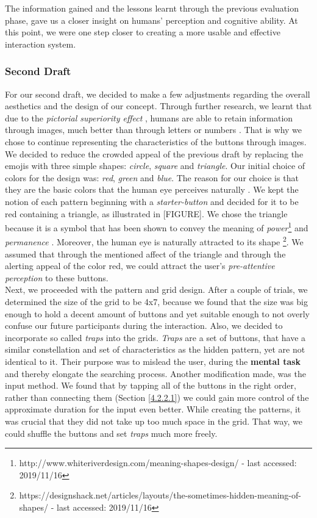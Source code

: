 The information gained and the lessons learnt through the previous evaluation phase, gave us a closer insight on humans' perception and cognitive ability. At this point, we were one step closer to creating a more usable and effective interaction system.

\subsubsection{Second Draft} \label{4.2.2.3}

For our second draft, we decided to make a few adjustments regarding the overall aesthetics and the design of our concept. Through further research, we learnt that due to the \textit{pictorial superiority effect} \cite{pictorial}, humans are able to retain information through images, much better than through letters or numbers \cite{pictorial, 2014}. That is why we chose to continue representing the characteristics of the buttons through images. We decided to reduce the crowded appeal of the previous draft by replacing the emojis with three simple shapes: \textit{circle}, \textit{square} and \textit{triangle}. Our initial choice of colors for the design was: \textit{red}, \textit{green} and \textit{blue}. The reason for our choice is that they are the basic colors that the human eye perceives naturally \cite{Butz2014}. We kept the notion of each pattern beginning with a \textit{starter-button} and decided for it to be red containing a triangle, as illustrated in [FIGURE]. We chose the triangle because it is a symbol that has been shown to convey the meaning of \textit{power}\footnote{http://www.whiteriverdesign.com/meaning-shapes-design/ - last accessed: 2019/11/16} and \textit{permanence} \cite{Frutiger1998}.  Moreover, the human eye is naturally attracted to its shape \footnote{https://designshack.net/articles/layouts/the-sometimes-hidden-meaning-of-shapes/ - last accessed: 2019/11/16}. We assumed that through the mentioned affect of the triangle and through the alerting appeal of the color red, we could attract the user's \textit{pre-attentive perception} \cite{Butz2014} to these buttons. \\

Next, we proceeded with the pattern and grid design. After a couple of trials, we determined the size of the grid to be 4x7, because we found that the size was big enough to hold a decent amount of buttons and yet suitable enough to not overly confuse our future participants during the interaction. Also, we decided to incorporate so called \textit{traps} into the grids. \textit{Traps} are a set of buttons, that have a similar constellation and set of characteristics as the hidden pattern, yet are not identical to it. Their purpose was to mislead the user, during the \textbf{mental task} and thereby elongate the searching process. Another modification made, was the input method. We found that by tapping all of the buttons in the right order, rather than connecting them (Section \ref{4.2.2.1}) we could gain more control of the approximate duration for the input even better. While creating the patterns, it was crucial that they did not take up too much space in the grid. That way, we could shuffle the buttons and set \textit{traps} much more freely. 


